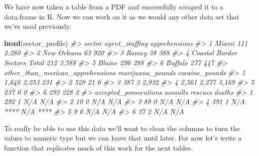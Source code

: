 \documentclass[
  12pt,
]{book}
\newenvironment{Shaded}{\begin{snugshade}}{\end{snugshade}}
\newcommand{\CommentTok}[1]{\textcolor[rgb]{0.37,0.37,0.37}{\textit{#1}}}
\newcommand{\KeywordTok}[1]{\textcolor[rgb]{0.27,0.27,0.27}{\textbf{#1}}}
\newcommand{\NormalTok}[1]{#1}
\begin{document}
We have now taken a table from a PDF and successfully scraped it to a data.frame in R. Now we can work on it as we would any other data set that we've used previously.

\begin{Shaded}
\begin{Highlighting}[]
\KeywordTok{head}\NormalTok{(sector\_profile)}
\CommentTok{\#\textgreater{}                         sector agent\_staffing apprehensions}
\CommentTok{\#\textgreater{} 1                        Miami            111         2,280}
\CommentTok{\#\textgreater{} 2                  New Orleans             63           920}
\CommentTok{\#\textgreater{} 3                        Ramey             38           388}
\CommentTok{\#\textgreater{} 4 Coastal Border Sectors Total            212         3,588}
\CommentTok{\#\textgreater{} 5                       Blaine            296           288}
\CommentTok{\#\textgreater{} 6                      Buffalo            277           447}
\CommentTok{\#\textgreater{}   other\_than\_mexican\_apprehensions marijuana\_pounds cocaine\_pounds}
\CommentTok{\#\textgreater{} 1                            1,646            2,253            231}
\CommentTok{\#\textgreater{} 2                              528               21              6}
\CommentTok{\#\textgreater{} 3                              387                3          2,932}
\CommentTok{\#\textgreater{} 4                            2,561            2,277          3,169}
\CommentTok{\#\textgreater{} 5                              237                0              0}
\CommentTok{\#\textgreater{} 6                              293              228              2}
\CommentTok{\#\textgreater{}   accepted\_prosecutions assaults           rescues deaths}
\CommentTok{\#\textgreater{} 1                   292        1               N/A    N/A}
\CommentTok{\#\textgreater{} 2                    10        0               N/A    N/A}
\CommentTok{\#\textgreater{} 3                    89        0               N/A    N/A}
\CommentTok{\#\textgreater{} 4                   391        1 N/A **** N/A ****       }
\CommentTok{\#\textgreater{} 5                     9        0               N/A    N/A}
\CommentTok{\#\textgreater{} 6                    37        2               N/A    N/A}
\end{Highlighting}
\end{Shaded}

To really be able to use this data we'll want to clean the columns to turn the values to numeric type but we can leave that until later. For now let's write a function that replicates much of this work for the next tables.
\end{document}

